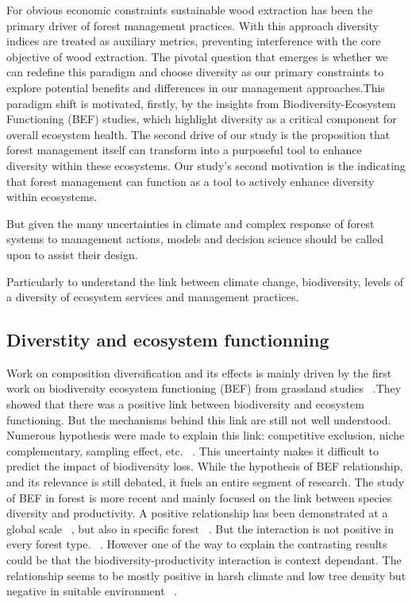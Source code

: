 \documentclass{article}
\begin{document}
For obvious economic constraints sustainable wood extraction has been the primary driver of forest management practices. With this approach diversity indices are treated as auxiliary metrics, preventing interference with the core objective of wood extraction. The pivotal question that emerges is whether we can redefine this paradigm and choose diversity as our primary constraints to explore potential benefits and differences in our management approaches.This paradigm shift is motivated, firstly, by the insights from Biodiversity-Ecosystem Functioning (BEF) studies, which highlight diversity as a critical component for overall ecosystem health. The second drive of our study is the proposition that forest management itself can transform into a purposeful tool to enhance diversity within these ecosystems. Our study's second motivation is the indicating that forest management can function as a tool to actively enhance diversity within ecosystems.

But given the many uncertainties in climate and complex response of forest systems to management actions, models and decision science should be called upon to assist their design.

Particularly to understand the link between climate change, biodiversity, levels of a diversity of ecosystem services and management practices. \\

\subsection{Diverstity and ecosystem functionning}

Work on composition diversification and its effects is mainly driven by the first work on biodiversity ecosystem functioning (BEF) from grassland studies ~\autocite{tilmanBiodiversityPopulationEcosystem1996}.They showed that there was a positive link between biodiversity and ecosystem functioning. But the mechanisms behind this link are still not well understood. Numerous hypothesis were made to explain this link: competitive exclusion, niche complementary, sampling effect, etc. ~\autocite{aliBiodiversityEcosystemFunctioning2023}. This uncertainty makes it difficult to predict the impact of biodiversity loss.
While the hypothesis of BEF relationship, and its relevance is still debated, it fuels an entire segment of research.
The study of BEF in forest is more recent and mainly focused on the link between species diversity and productivity. A positive relationship has been demonstrated at a global scale ~\autocite{liangPositiveBiodiversityproductivityRelationship2016}, but also in specific forest ~\autocite{morinTreeSpeciesRichness2011,paquetteEffectBiodiversityTree2011,jourdanManagingMixedStands2021}. But the interaction is not positive in every forest type. ~\autocite{forresterReviewProcessesDiversity2016}.
However one of the way to explain the contrasting results could be that the biodiversity-productivity interaction is context dependant. The relationship seems to be mostly positive in harsh climate and low tree density but negative in suitable environment ~\autocite{juckerClimateModulatesEffects2016}.
\end{document}
